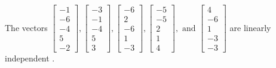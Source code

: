 \begin{exercise}
\begin{exerciseStatement}
  \end{exerciseStatement}
  \begin{exerciseAnswer}
   The vectors \(\left[\begin{array}{r}
-1 \\
-6 \\
-4 \\
5 \\
-2
\end{array}\right] , \left[\begin{array}{r}
-3 \\
-1 \\
-4 \\
5 \\
3
\end{array}\right] , \left[\begin{array}{r}
-6 \\
2 \\
-6 \\
1 \\
-3
\end{array}\right] , \left[\begin{array}{r}
-5 \\
-5 \\
2 \\
1 \\
4
\end{array}\right] , \text{ and } \left[\begin{array}{r}
4 \\
-6 \\
1 \\
-3 \\
-3
\end{array}\right]\) are 
  	 linearly independent  .
  


  \end{exerciseAnswer}
\end{exercise}